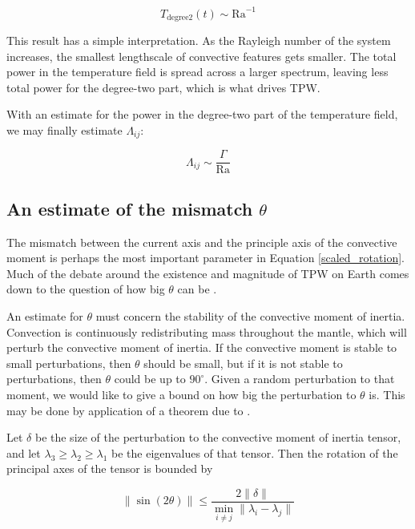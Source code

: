 \documentclass[extra,mreferee]{gji}
\begin{document}
\begin{equation}
T_{\mathrm{degree 2}}(t) \sim \mathrm{Ra}^{-1}
\end{equation}

This result has a simple interpretation.  As the Rayleigh number of the system increases, the smallest lengthscale of convective features gets smaller.  The total power in the temperature field is spread across a larger spectrum, leaving less total power for the degree-two part, which is what drives TPW.

With an estimate for the power in the degree-two part of the temperature field, we may finally estimate $\Lambda_{ij}$:

\begin{equation}
\Lambda_{ij} \sim \frac{\Gamma}{\mathrm{Ra} }
\end{equation}


\subsection{An estimate of the mismatch $\theta$}

The mismatch between the current axis and the principle axis of the convective moment is perhaps the most important parameter in Equation \ref{scaled_rotation}.  
Much of the debate around the existence and magnitude of TPW on Earth comes down to the question of how big $\theta$ can be \citep{kirschvink1997evidence, steinberger1997changes}.

An estimate for $\theta$ must concern the stability of the convective moment of inertia. 
Convection is continuously redistributing mass throughout the mantle, which will perturb the convective moment of inertia.  
If the convective moment is stable to small perturbations, then $\theta$ should be small, but if it is not stable to perturbations, then $\theta$ could be up to $90^\circ$. 
Given a random perturbation to that moment, we would like to give a bound on how big the perturbation to $\theta$ is. 
This may be done by application of a theorem due to \citet{davis1970rotation}.

Let $\delta$ be the size of the perturbation to the convective moment of inertia tensor, and let $\lambda_3 \ge \lambda_2 \ge \lambda_1$ be the eigenvalues of that tensor.  
Then the rotation of the principal axes of the tensor is bounded by

\begin{equation}
\lVert \sin(2 \theta) \rVert \le \frac{ 2 \lVert \delta \rVert}{ \displaystyle \min_{i \neq j} \lVert \lambda_i - \lambda_j \rVert }
\label{eq:kahan}
\end{equation} 
\end{document}
